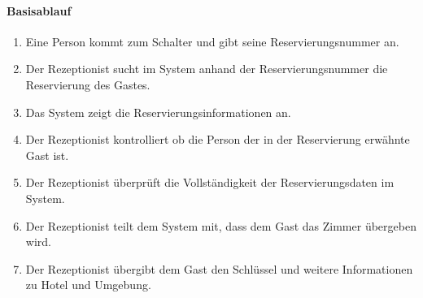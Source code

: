 \paragraph{Basisablauf}
\begin{enumerate}
	\item Eine Person kommt zum Schalter und gibt seine \Gls{Reservierungsnummer} an.
	\item Der \Gls{Rezeptionist} sucht im System anhand der \Gls{Reservierungsnummer} die Reservierung des \Gls{Gast}es.
	\item Das System zeigt die Reservierungsinformationen an.
	\item Der \Gls{Rezeptionist} kontrolliert ob die Person der in der \Gls{Reservierung} erwähnte \Gls{Gast} ist.
	\item Der \Gls{Rezeptionist} überprüft die Vollständigkeit der Reservierungsdaten im System.
	\item Der \Gls{Rezeptionist} teilt dem System mit, dass dem \Gls{Gast} das \Gls{Zimmer} übergeben wird.
	\item Der \Gls{Rezeptionist} übergibt dem \Gls{Gast} den Schlüssel und weitere Informationen zu Hotel und Umgebung.
\end{enumerate}

